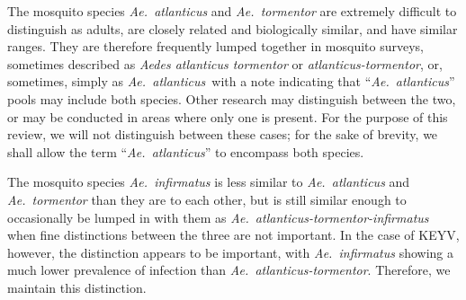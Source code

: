 \documentclass[12pt]{article}
\newcommand{\atl}{\textit{Ae.\ atlanticus}}
\begin{document}
                The mosquito species \textit{Ae.~atlanticus} and \textit{Ae.~tormentor} are extremely difficult to distinguish as adults, are closely related and biologically similar, and have similar ranges\cite{burkett2013mosquitoes}. They are therefore frequently lumped together in mosquito surveys, sometimes described as \textit{Aedes atlanticus tormentor}\cite{bond1966california} or \textit{atlanticus-tormentor}, or, sometimes, simply as \atl\, with a note indicating that ``\atl'' pools may include both species. Other research may distinguish between the two, or may be conducted in areas where only one is present. For the purpose of this review, we will not distinguish between these cases; for the sake of brevity, we shall allow the term ``\atl'' to encompass both species.

                The mosquito species \textit{Ae.~infirmatus} is less similar to \textit{Ae.~atlanticus} and \textit{Ae.~tormentor} than they are to each other, but is still similar enough to occasionally be lumped in with them as \textit{Ae.~atlanticus-tormentor-infirmatus} when fine distinctions between the three are not important. In the case of KEYV, however, the distinction appears to be important, with \textit{Ae.~infirmatus} showing a much lower prevalence of infection than \textit{Ae.~atlanticus-tormentor}.\cite{taylor1971california} Therefore, we maintain this distinction.
\end{document}
